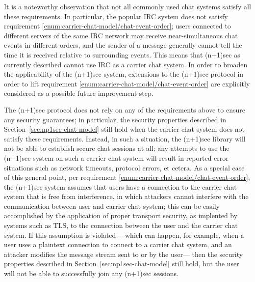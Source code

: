 \documentclass{article}
\begin{document}
It is a noteworthy observation that not all commonly used chat systems satisfy all these requirements.
In particular, the popular IRC system does not satisfy requirement \ref{enum:carrier-chat-model/chat-event-order}; users connected to different servers of the same IRC network may receive near-simultaneous chat events in different orders, and the sender of a message generally cannot tell the time it is received relative to surrounding events.
This means that (n+1)sec as currently described cannot use IRC as a carrier chat system.
In order to broaden the applicability of the (n+1)sec system, extensions to the (n+1)sec protocol in order to lift requirement \ref{enum:carrier-chat-model/chat-event-order} are explicitly considered as a possible future improvement step.

The (n+1)sec protocol does not rely on any of the requirements above to ensure any security guarantees; in particular, the security properties described in Section~\ref{sec:np1sec-chat-model} still hold when the carrier chat system does not satisfy these requirements.
Instead, in such a situation, the (n+1)sec library will not be able to establish secure chat sessions at all; any attempts to use the (n+1)sec system on such a carrier chat system will result in reported error situations such as network timeouts, protocol errors, et cetera.
As a special case of this general point, per requirement \ref{enum:carrier-chat-model/chat-event-order}, the (n+1)sec system assumes that users have a connection to the carrier chat system that is free from interference, in which attackers cannot interfere with the communication between user and carrier chat system; this can be easily accomplished by the application of proper transport security, as implented by systems such as TLS, to the connection between the user and the carrier chat system.
If this assumption is violated ---which can happen, for example, when a user uses a plaintext connection to connect to a carrier chat system, and an attacker modifies the message stream sent to or by the user--- then the security properties described in Section~\ref{sec:np1sec-chat-model} still hold, but the user will not be able to successfully join any (n+1)sec sessions.
\end{document}
